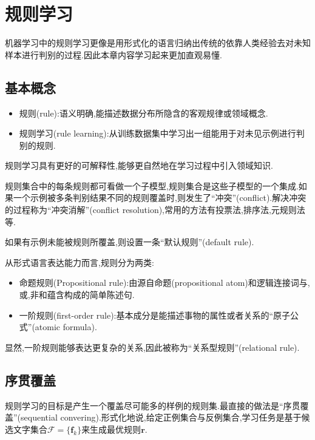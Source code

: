 \chapter{规则学习}

机器学习中的规则学习更像是用形式化的语言归纳出传统的依靠人类经验去对未知样本进行判别的过程.因此本章内容学习起来更加直观易懂.

\section{基本概念}

\begin{itemize}
\item 规则(rule):语义明确,能描述数据分布所隐含的客观规律或领域概念.
\item 规则学习(rule learning):从训练数据集中学习出一组能用于对未见示例进行判别的规则.
\end{itemize}

规则学习具有更好的可解释性,能够更自然地在学习过程中引入领域知识.

规则集合中的每条规则都可看做一个子模型,规则集合是这些子模型的一个集成.如果一个示例被多条判别结果不同的规则覆盖时,则发生了``冲突''(conflict).解决冲突的过程称为``冲突消解''(conflict resolution),常用的方法有投票法,排序法,元规则法等.

如果有示例未能被规则所覆盖,则设置一条``默认规则''(default rule).

从形式语言表达能力而言,规则分为两类:

\begin{itemize}
\item 命题规则(Propositional rule):由源自命题(propositional atom)和逻辑连接词与,或,非和蕴含构成的简单陈述句.
\item 一阶规则(first-order rule):基本成分是能描述事物的属性或者关系的``原子公式''(atomic formula).
\end{itemize}

显然,一阶规则能够表达更复杂的关系,因此被称为``关系型规则''(relational rule).

\section{序贯覆盖}

规则学习的目标是产生一个覆盖尽可能多的样例的规则集.最直接的做法是``序贯覆盖''(sequential convering).形式化地说,给定正例集合与反例集合,学习任务是基于候选文字集合$\mathcal F=\{\mathbf f_k\}$来生成最优规则$\mathbf r$.


